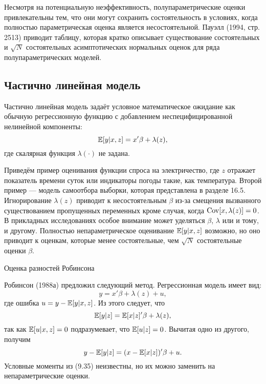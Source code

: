 Несмотря на потенциальную неэффективность, полупараметрические оценки привлекательны тем, что
они могут сохранить состоятельность в условиях, когда полностью параметрическая оценка является несостоятельной. Пауэлл (1994, стр. 2513) приводит таблицу, которая кратко описывает существование состоятельных и $\sqrt{N}$ состоятельных асимптотических нормальных оценок для ряда полупараметрических моделей.

\subsection{Частично линейная модель}

Частично линейная модель задаёт условное математическое ожидание как обычную регрессионную функцию с добавлением неспецифицированной нелинейной компоненты:
\begin{equation}
\mathbb{E}[y|x,z] = x'\beta + \lambda(z),
\end{equation}
где скалярная функция $\lambda(\cdot)$ не задана.

Приведём пример оценивания функции спроса на электричество, где $z$ отражает показатель времени суток или индикаторы погоды такие, как температура. Второй пример --- модель самоотбора выборки, которая представлена в разделе 16.5. Игнорирование $\lambda(z)$ приводит к несостоятельным $\beta$ из-за смещения вызванного существованием пропущенных переменных кроме случая, когда $\mathrm{Cov}[x,\lambda(z)] = 0$. В прикладных исследованиях особое внимание может уделяться $\beta$, $\lambda$ или и тому, и другому. Полностью непараметрическое оценивание $\mathbb{E}[y|x,z]$ возможно, но оно приводит к оценкам, которые менее состоятельные, чем $\sqrt{N}$ состоятельные оценки $\beta$.

\begin{center}
Оценка разностей Робинсона
\end{center}

Робинсон (1988а) предложил следующий метод. Регрессионная модель имеет вид:
\[
y = x'\beta + \lambda(z) + u,
\]
где ошибка $u = y - \mathbb{E}[y|x,z]$. Из этого следует, что
\[
\mathbb{E}[y|z] = \mathbb{E}[x|z]'\beta + \lambda(z),
\]
так как $\mathbb{E}[u|x,z] = 0$ подразумевает, что $\mathbb{E}[u|z] = 0$. Вычитая одно из другого, получим
\begin{equation}
y - \mathbb{E}[y|z] = (x - \mathbb{E}[x|z])'\beta + u.
\end{equation}
Условные моменты из (9.35) неизвестны, но их можно заменить на непараметрические оценки.

